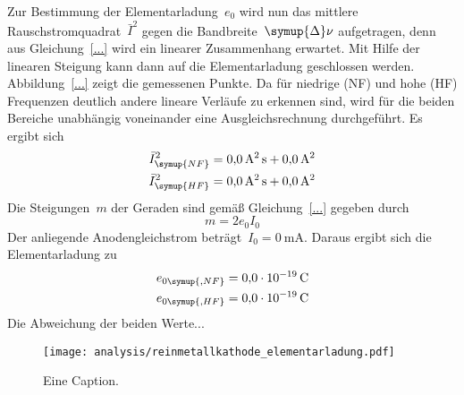 Zur Bestimmung der Elementarladung~$e_0$ wird nun das mittlere
Rauschstromquadrat~$\bar{I}^2$ gegen die Bandbreite~$\symup{\Delta}\nu$
aufgetragen, denn aus Gleichung~\eqref{...} wird ein linearer Zusammenhang
erwartet. Mit Hilfe der linearen Steigung kann dann auf die Elementarladung
geschlossen werden. Abbildung~\ref{...} zeigt die gemessenen Punkte. Da für
niedrige (NF) und hohe (HF) Frequenzen deutlich andere lineare Verläufe zu
erkennen sind, wird für die beiden Bereiche unabhängig voneinander eine
Ausgleichsrechnung durchgeführt. Es ergibt sich
%
\begin{align}
    \bar{I}^2_{\symup{NF}}&=\SI{0.0(0)}{\ampere\squared\second}+\SI{0.0(0)}{\ampere\squared} \\
    \bar{I}^2_{\symup{HF}}&=\SI{0.0(0)}{\ampere\squared\second}+\SI{0.0(0)}{\ampere\squared}
\end{align}
%
Die Steigungen~$m$ der Geraden sind gemäß Gleichung~\eqref{...} gegeben durch
%
\begin{equation}
  m=2e_0I_0
\end{equation}
%
Der anliegende Anodengleichstrom beträgt~$I_0=\SI{0}{\milli\ampere}$. Daraus
ergibt sich die Elementarladung zu
%
\begin{align}
  e_{0\symup{, NF}}&=\SI{0.0(0)e-19}{\coulomb} \\
  e_{0\symup{, HF}}&=\SI{0.0(0)e-19}{\coulomb}
\end{align}
%
Die Abweichung der beiden Werte...

\begin{figure}
  \texttt{[image: analysis/reinmetallkathode\_elementarladung.pdf]}
  \caption{Eine Caption.}
  \label{fig:reinmetallkathode_elementarladung}
\end{figure}
